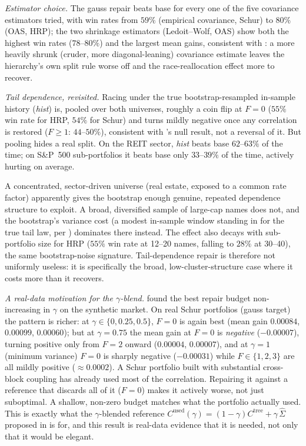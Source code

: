 \documentclass[11pt]{article}
\begin{document}
\emph{Estimator choice.} The gauss repair beats base for every one of the
five covariance estimators tried, with win rates from $59\%$ (empirical
covariance, Schur) to $80\%$ (OAS, HRP); the two shrinkage estimators
(Ledoit--Wolf, OAS) show both the highest win rates ($78$--$80\%$) and the
largest mean gains, consistent with : a more heavily
shrunk (cruder, more diagonal-leaning) covariance estimate leaves the
hierarchy's own split rule worse off and the race-reallocation effect more
to recover.

\emph{Tail dependence, revisited.} Racing under the true bootstrap-resampled
in-sample history (\emph{hist}) is, pooled over both universes, roughly a
coin flip at $F=0$ ($55\%$ win rate for HRP, $54\%$ for Schur) and turns
mildly negative once any correlation is restored ($F\ge1$: $44$--$50\%$),
consistent with 's null result, not a reversal of it.
But pooling hides a real split. On the REIT sector, \emph{hist} beats base
$62$--$63\%$ of the time; on S\&P~500 sub-portfolios it beats base only
$33$--$39\%$ of the time, actively hurting on average.

A concentrated, sector-driven universe (real estate, exposed to a common
rate factor) apparently gives the bootstrap enough genuine, repeated
dependence structure to exploit. A broad, diversified sample of large-cap
names does not, and the bootstrap's variance cost (a modest in-sample window
standing in for the true tail law, per ) dominates
there instead. The effect also decays with sub-portfolio size for HRP
($55\%$ win rate at 12--20 names, falling to $28\%$ at 30--40), the same
bootstrap-noise signature. Tail-dependence repair is therefore not
uniformly useless: it is specifically the broad, low-cluster-structure case
where it costs more than it recovers.

\emph{A real-data motivation for the $\gamma$-blend.} 
found the best repair budget non-increasing in $\gamma$ on the synthetic
market. On real Schur portfolios (gauss target) the pattern is richer: at
$\gamma\in\{0,0.25,0.5\}$, $F=0$ is again best (mean gain $0.00084$,
$0.00099$, $0.00060$); but at $\gamma=0.75$ the mean gain at $F=0$ is
\emph{negative} ($-0.00007$), turning positive only from $F=2$ onward
($0.00004$, $0.00007$), and at $\gamma=1$ (minimum variance) $F=0$ is
sharply negative ($-0.00031$) while $F\in\{1,2,3\}$ are all mildly positive
($\approx0.0002$). A Schur portfolio built with substantial cross-block coupling has already
used most of the correlation. Repairing it against a reference that
discards all of it ($F=0$) makes it actively worse, not just suboptimal.
A shallow, non-zero budget matches what the portfolio actually used. This is exactly what the $\gamma$-blended reference
$C^{\mathrm{used}}(\gamma)=(1-\gamma)C^{\mathrm{tree}}+\gamma\,\hat\Sigma$
proposed in  is for, and this result is real-data
evidence that it is needed, not only that it would be elegant.
\end{document}
